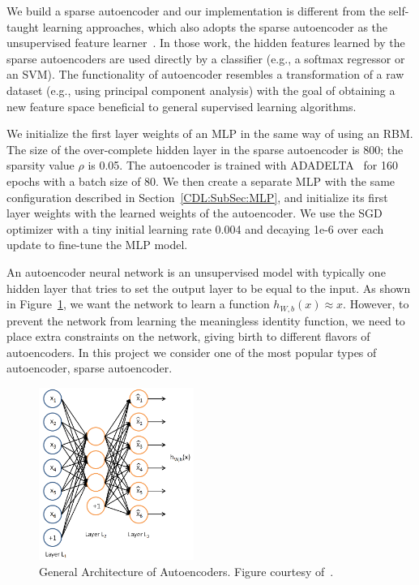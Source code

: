 We build a sparse autoencoder and our implementation is different from the
self-taught learning approaches, which also adopts the sparse autoencoder as the unsupervised feature learner~\cite{STL-NIDS, SparseAE}.
In those work, the hidden features learned by the sparse autoencoders are used directly by a classifier (e.g., a softmax regressor or an SVM).
The functionality of autoencoder resembles a transformation of a raw dataset (e.g., using principal component analysis) with the goal of obtaining a new feature space beneficial to general supervised learning algorithms.

We initialize the first layer weights of an MLP in the same way of using an RBM.
The size of the over-complete hidden layer in the sparse autoencoder is 800; the sparsity value $\rho$ is 0.05.
The autoencoder is trained with ADADELTA~\cite{ADADELTA} for 160 epochs with a batch size of 80.
We then create a separate MLP with the same configuration described in Section~\ref{CDL:SubSec:MLP},
and initialize its first layer weights with the learned weights of the autoencoder.
We use the SGD optimizer with a tiny initial learning rate 0.004
and decaying 1e-6 over each update to fine-tune the MLP model.

\iffalse
An autoencoder neural network is an unsupervised model with typically one hidden layer that
tries to set the output layer to be equal to the input.
As shown in Figure~\ref{Fig:AEArchitecture}, we want the network to
learn a function $h_{W, b}(x) \approx x$.
However, to prevent the network from learning the meaningless identity function,
we need to place extra constraints on the network, giving birth to different
flavors of autoencoders.
In this project we consider one of the most popular types of autoencoder, sparse autoencoder.

\begin{figure}[h]
    \centering
    \includegraphics[width=0.45\textwidth]{figures/autoencoder.png}
    \caption{General Architecture of Autoencoders.
        Figure courtesy of~\cite{UFLDLAutoencoder}.}
    \label{Fig:AEArchitecture}
\end{figure}

